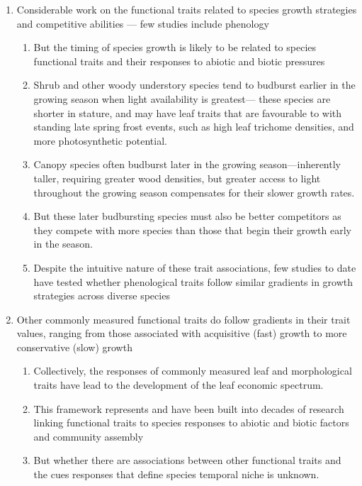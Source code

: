 \documentclass{article}
\begin{document}
\begin{enumerate}
\item Considerable work on the functional traits related to species growth strategies and competitive abilities — few studies include phenology
\begin{enumerate}
\item But the timing of species growth is likely to be related to species functional traits and their responses to abiotic and biotic pressures
\item Shrub and other woody understory species tend to budburst earlier in the growing season when light availability is greatest--- these species are shorter in stature, and may have leaf traits that are favourable to with standing late spring frost events, such as high leaf trichome densities, and more photosynthetic potential.
\item Canopy species often budburst later in the growing season---inherently taller, requiring greater wood densities, but greater access to light  throughout the growing season compensates for their slower growth rates.
\item But these later budbursting species must also be better competitors as they compete with more species than those that begin their growth early in the season.
\item Despite the intuitive nature of these trait associations, few studies to date have tested whether phenological traits follow similar gradients in growth strategies across diverse species
\end{enumerate}
\item Other commonly measured functional traits do follow gradients in their trait values, ranging from those associated with acquisitive (fast) growth to more conservative (slow) growth
\begin{enumerate}
\item Collectively, the responses of commonly measured leaf and morphological traits have lead to the development of the leaf economic spectrum. 
\item This framework represents and have been built into decades of research linking functional traits to species responses to abiotic and biotic factors and community assembly
\item But whether there are associations between other functional traits and the cues responses that define species temporal niche is unknown.
\end{enumerate}


\end{enumerate}
\end{document}

